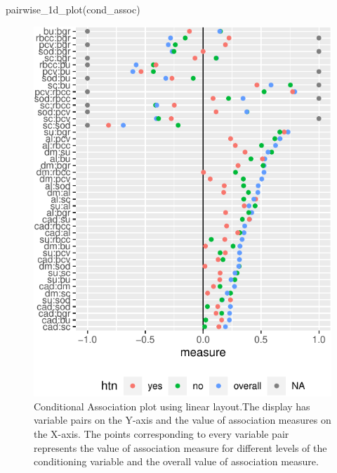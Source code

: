 \begin{Schunk}
\begin{Sinput}
pairwise_1d_plot(cond_assoc)
\end{Sinput}
\begin{figure}

{\centering \includegraphics{rj_paper_files/figure-latex/linear-cond-assoc-1} 

}

\caption[Conditional Association plot using linear layout.The display has variable pairs on the Y-axis and the value of association measures on the X-axis]{Conditional Association plot using linear layout.The display has variable pairs on the Y-axis and the value of association measures on the X-axis. The points corresponding to every variable pair represents the value of association measure for different levels of the conditioning variable and the overall value of association measure.}\label{fig:linear-cond-assoc}
\end{figure}
\end{Schunk}

